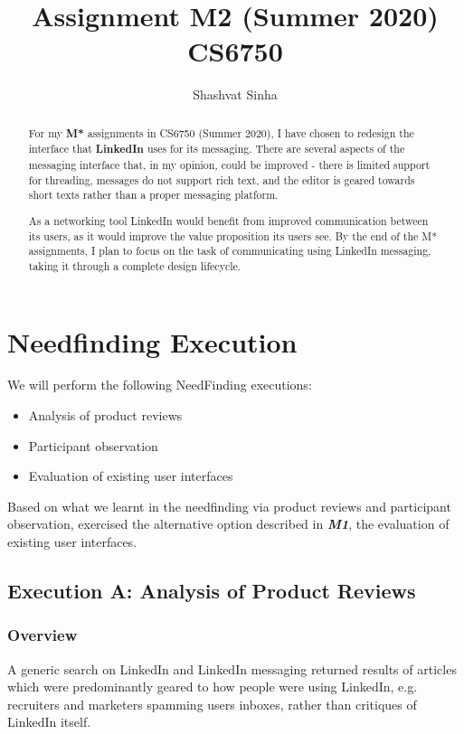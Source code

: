 \documentclass[
	letterpaper, %
]{jdf}
\author{Shashvat Sinha}
\title{Assignment M2 (Summer 2020)\\CS6750}
\begin{document}

\maketitle

\begin{abstract}
    For my \textbf{M*} assignments in CS6750 (Summer 2020), I have chosen to redesign the interface that \textbf{LinkedIn} uses for its messaging. There are several aspects of the messaging interface that, in my opinion, could be improved - there is limited support for threading, messages do not support rich text, and the editor is geared towards short texts rather than a proper messaging platform. 
    
    As a networking tool LinkedIn would benefit from improved communication between its users, as it would improve the value proposition its users see. By the end of the M* assignments, I plan to focus on the task of communicating using LinkedIn messaging, taking it  through a complete design lifecycle. 
\end{abstract}

\section{Needfinding Execution}
We will perform the following NeedFinding executions:

\begin{itemize}
    \item Analysis of product reviews
    \item Participant observation
    \item Evaluation of existing user interfaces
\end{itemize}

Based on what we learnt in the needfinding via product reviews and participant observation,  exercised the alternative option described in \textbf{\emph{M1}}, the evaluation of existing user interfaces.


\subsection{Execution A: Analysis of Product Reviews}
\subsubsection{Overview}
A generic search on LinkedIn and LinkedIn messaging returned results of articles which were predominantly geared to how people were using LinkedIn, e.g. recruiters and marketers spamming users inboxes, rather than critiques of LinkedIn itself.
\end{document}
